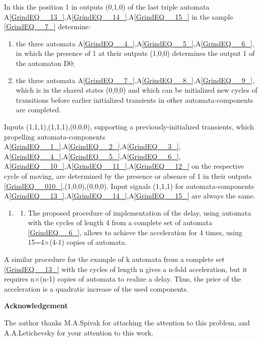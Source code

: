 \documentclass{article}
\begin{document}
In this the position 1 in outputs (0,1,0) of the last triple automata A\eqref{GrindEQ__13_},A\eqref{GrindEQ__14_},A\eqref{GrindEQ__15_} in the sample \eqref{GrindEQ__7_} determine:

\begin{enumerate}
\item  the three automata A\eqref{GrindEQ__4_},A\eqref{GrindEQ__5_},A\eqref{GrindEQ__6_}, in which the presence of 1 at their outputs (1,0,0) determines the output 1 of the automaton D0;

\item  the three automata A\eqref{GrindEQ__7_},A\eqref{GrindEQ__8_},A\eqref{GrindEQ__9_}, which is in the shared states (0,0,0) and which can be initialized new cycles of transitions before earlier initialized transients in other automata-components are completed.
\end{enumerate}

Inputs (1,1,1),(1,1,1),(0,0,0), supporting a previously-initialized transients, which propelling automata-components A\eqref{GrindEQ__1_},A\eqref{GrindEQ__2_},A\eqref{GrindEQ__3_}, A\eqref{GrindEQ__4_},A\eqref{GrindEQ__5_},A\eqref{GrindEQ__6_}, A\eqref{GrindEQ__10_},A\eqref{GrindEQ__11_},A\eqref{GrindEQ__12_} on the respective cycle of moving, are determined by the presence or absence of 1 in their outputs \eqref{GrindEQ__010_},(1,0,0),(0,0,0). Input signals (1,1,1) for automata-components A\eqref{GrindEQ__13_},A\eqref{GrindEQ__14_},A\eqref{GrindEQ__15_} are always the same.

\begin{enumerate}
\item \begin{enumerate}
\item  The proposed procedure of implementation of the delay, using automata with the cycles of length 4 from a complete set of automata \eqref{GrindEQ__6_}, allows to achieve the acceleration for 4 times, using 15=4$\times$(4-1) copies of automata.
\end{enumerate}
\end{enumerate}

A similar procedure for the example of k automata from a complete set \eqref{GrindEQ__13_} with the cycles of length n gives a n-fold acceleration, but it requires n$\times$(n-1) copies of automata to realize a delay. Thus, the price of the acceleration is a quadratic increase of the used components.

\textbf{Acknowledgement}

The author thanks M.A.Spivak for attaching the attention to this problem, and A.A.Letichevsky for your attention to this work.
\end{document}
